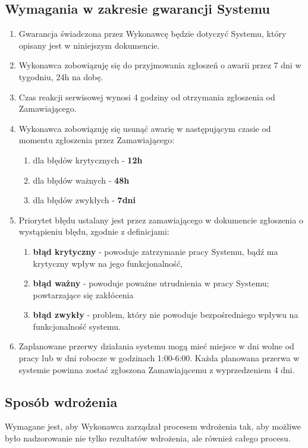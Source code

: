 \documentclass{article}
\begin{document}
\subsection{Wymagania w zakresie gwarancji Systemu}
\begin{enumerate}
	\item Gwarancja świadczona przez Wykonawcę będzie dotyczyć Systemu, który opisany jest w niniejszym dokumencie.
	\item Wykonawca zobowiązuję się do przyjmowania zgłoszeń o awarii przez 7 dni w tygodniu, 24h na dobę.
	\item Czas reakcji serwisowej wynosi 4 godziny od otrzymania zgłoszenia od Zamawiającego.
	\item Wykonawca zobowiązuję się usunąć awarię w następującym czasie od momentu zgłoszenia przez Zamawiającego:
	\begin{enumerate}
		\item dla błędów krytycznych - \textbf{12h}
		\item dla błędów ważnych - \textbf{48h}
		\item dla błędów zwykłych - \textbf{7dni}
	\end{enumerate}

	\item Priorytet błędu ustalany jest przez zamawiającego w dokumencie zgłoszenia o wystąpieniu błędu, zgodnie z definicjami:
	\begin{enumerate}
		\item \textbf{błąd krytyczny} - powoduje zatrzymanie pracy Systemu, bądź ma krytyczny wpływ na jego funkcjonalność,
		\item \textbf{błąd ważny} - powoduje poważne utrudnienia w pracy Systemu; powtarzające się zakłócenia
		\item \textbf{błąd zwykły} - problem, który nie powoduje bezpośredniego wpływu na funkcjonalność systemu.
	\end{enumerate}

	\item Zaplanowane przerwy działania systemu mogą mieć miejsce w dni wolne od pracy lub w dni robocze w godzinach 1:00-6:00. Każda planowana przerwa w systemie powinna zostać zgłoszona Zamawiającemu z wyprzedzeniem 4 dni.

\end{enumerate}
\subsection{Sposób wdrożenia}
Wymagane jest, aby Wykonawca zarządzał procesem wdrożenia tak, aby możliwe było nadzorowanie nie tylko rezultatów wdrożenia, ale również całego procesu.
\end{document}
